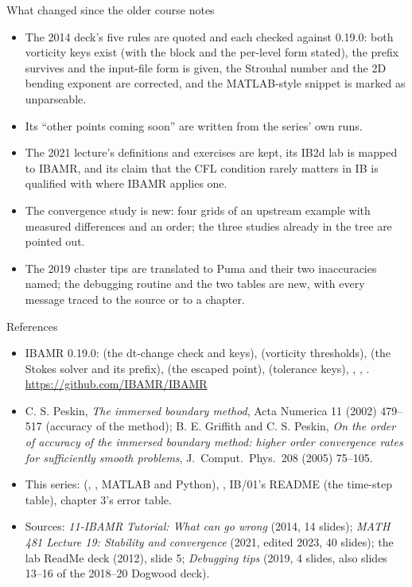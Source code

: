 \documentclass[aspectratio=169,11pt]{beamer}
\begin{document}
\begin{frame}{What changed since the older course notes}
\label{fr:changed}
\footnotesize
\begin{itemize}
  \item The 2014 deck's five rules are quoted and each checked against 0.19.0: both vorticity keys exist (with the block and the per-level form stated), the  prefix survives and the input-file form is given, the Strouhal number and the 2D bending exponent are corrected, and the MATLAB-style snippet is marked as unparseable.
  \item Its ``other points coming soon'' are written from the series' own runs.
  \item The 2021 lecture's definitions and exercises are kept, its IB2d lab is mapped to IBAMR, and its claim that the CFL condition rarely matters in IB is qualified with where IBAMR applies one.
  \item The convergence study is new: four grids of an upstream example with measured differences and an order; the three studies already in the tree are pointed out.
  \item The 2019 cluster tips are translated to Puma and their two inaccuracies named; the debugging routine and the two tables are new, with every message traced to the source or to a chapter.
\end{itemize}
\end{frame}

\begin{frame}{References}
\label{fr:refs}
\scriptsize
\begin{itemize}
  \item IBAMR 0.19.0:  (the dt-change check and keys),  (vorticity thresholds),  (the Stokes solver and its prefix),  (the escaped point),  (tolerance keys), , , . \url{https://github.com/IBAMR/IBAMR}
  \item C. S. Peskin, \emph{The immersed boundary method}, Acta Numerica 11 (2002) 479--517 (accuracy of the method); B. E. Griffith and C. S. Peskin, \emph{On the order of accuracy of the immersed boundary method: higher order convergence rates for sufficiently smooth problems}, J.\ Comput.\ Phys.\ 208 (2005) 75--105.
  \item This series:  (, , MATLAB and Python), , IB/01's README (the time-step table), chapter 3's error table.
  \item Sources: \emph{11-IBAMR Tutorial: What can go wrong} (2014, 14 slides); \emph{MATH 481 Lecture 19: Stability and convergence} (2021, edited 2023, 40 slides); the lab ReadMe deck (2012), slide 5; \emph{Debugging tips} (2019, 4 slides, also slides 13--16 of the 2018--20 Dogwood deck).
\end{itemize}
\end{frame}
\end{document}
